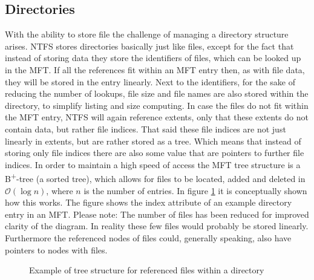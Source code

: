 \subsection{Directories}
With the ability to store file the challenge of managing a directory structure arises. NTFS stores directories basically just like files, except for the fact that instead of storing data they store the identifiers of files, which can be looked up in the MFT. If all the references fit within an MFT entry then, as with file data, they will be stored in the entry linearly. Next to the identifiers, for the sake of reducing the number of lookups, file size and file names are also stored within the directory, to simplify listing and size computing. In case the files do not fit within the MFT entry, NTFS will again reference extents, only that these extents do not contain data, but rather file indices. That said these file indices are not just linearly in extents, but are rather stored as a tree. Which means that instead of storing only file indices there are also some value that are pointers to further file indices. In order to maintain a high speed of access the MFT tree structure is a B\textsuperscript{+}-tree (a sorted tree), which allows for files to be located, added and deleted in $\mathcal{O}(\log{}n)$, where  $n$ is the number of entries. In figure \ref{fig:b-tree} it is conceptually shown how this works. The figure shows the index attribute of an example directory entry in an MFT. Please note: The number of files has been reduced for improved clarity of the diagram. In reality these few files would probably be stored linearly. Furthermore the referenced nodes of files could, generally speaking, also have pointers to nodes with files.
\begin{figure}[h]
	\centering
	\caption{Example of tree structure for referenced files within a directory\label{fig:b-tree}}
\end{figure}

